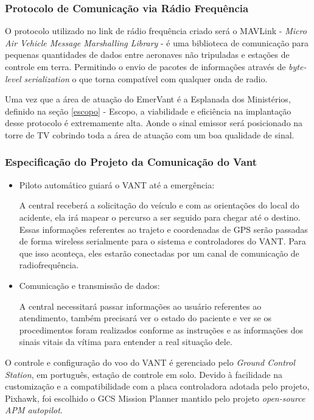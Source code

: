\subsubsection{Protocolo de Comunicação via Rádio Frequência}

O protocolo utilizado no link de rádio frequência criado será o MAVLink - \textit{Micro Air Vehicle Message Marshalling Library} - é uma biblioteca de comunicação para 
pequenas quantidades de dados entre aeronaves não tripuladas e estações de controle em terra. 
Permitindo o envio de pacotes de informações através de \textit{byte-level serialization} o que torna 
compatível com qualquer onda de radio.\cite{mavlink}

Uma vez que a área de atuação do EmerVant é a Esplanada dos Ministérios, 
definido na seção \ref{escopo} - Escopo, a viabilidade e eficiência na implantação desse protocolo é
extremamente alta. Aonde o sinal emissor será posicionado na torre de TV cobrindo toda a 
área de atuação com um boa qualidade de sinal. 

\subsubsection{Especificação do Projeto da Comunicação do Vant}

\begin{itemize}
 \item Piloto automático guiará o VANT até a emergência: 

  A central receberá a solicitação do veículo e com as orientações do local do acidente, ela irá mapear o percurso a ser seguido para chegar até o destino.  Essas informações referentes ao trajeto e coordenadas de GPS serão passadas de forma wireless serialmente para o sistema e controladores do VANT. Para que isso aconteça, eles estarão conectadas por um canal de comunicação de radiofrequência. 

  \item Comunicação e transmissão de dados:

   A central necessitará passar informações ao usuário referentes ao atendimento, também precisará ver o estado do paciente e ver se os procedimentos foram realizados conforme as instruções e as informações dos sinais vitais da vítima para entender a real situação dele. 
\end{itemize}
O controle e configura\c{c}\~ao do voo do VANT \'e gerenciado pelo \textit{Ground Control Station}, em português, 
esta\c{c}\~ao de controle em solo. Devido à facilidade na customização e a compatibilidade com a placa controladora adotada pelo projeto, Pixhawk, foi escolhido o GCS Mission Planner mantido pelo projeto \textit{open-source  APM autopilot}.\cite{gcs}

